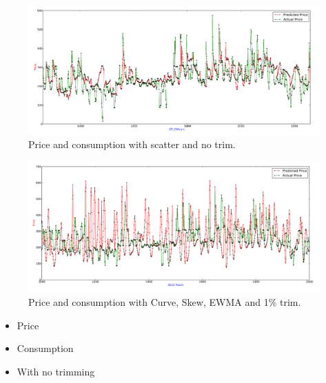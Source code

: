 \begin{figure}[H]
\centering
\includegraphics[width=\linewidth,natwidth=898,natheight=587]{billeder/PriceExperimentalAnalysis/X3_Price_Consump_NoTrim.png}
\caption{Price and consumption with scatter and no trim.}
\label{fig:X3_Price_Consump_NoTrim}
\end{figure}

\begin{figure}[H]
\centering
\includegraphics[width=\linewidth,natwidth=898,natheight=587]{billeder/PriceExperimentalAnalysis/X3_Price_Consump_Worst.png}
\caption{Price and consumption with Curve, Skew, EWMA and 1\% trim.}
\label{fig:X3_Price_Consump_Worst}
\end{figure}

\begin{itemize}
	\item Price
	\item Consumption
	\item With no trimming
\end{itemize}

